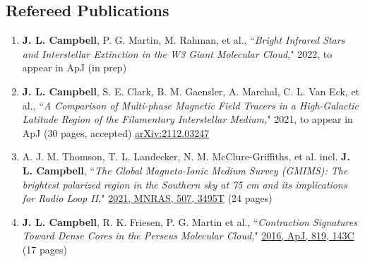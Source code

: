 \documentclass[10pt]{res} %
\begin{document}
\begin{resume}
\section{\Large Refereed Publications}
\vspace{-5pt} %
\noindent\makebox[\linewidth]{\rule{\textwidth}{0.4pt}}
\vspace{-15pt} %

\begin{enumerate}[{start=4,label=\arabic*.\addtocounter{enumi}{-2}}]
\itemsep-1em 
	\item \textbf{J. L. Campbell}, P. G. Martin, M. Rahman, et al., ``\textit{Bright Infrared Stars and Interstellar Extinction in the W3 Giant Molecular Cloud,}" 2022, to appear in ApJ (in prep) \\
	\item \textbf{J. L. Campbell}, S. E. Clark, B. M. Gaensler, A. Marchal, C. L. Van Eck, et al., ``\textit{A Comparison of Multi-phase Magnetic Field Tracers in a High-Galactic Latitude Region of the Filamentary Interstellar Medium,}" 2021, to appear in ApJ (30 pages, accepted) \href{https://ui.adsabs.harvard.edu/abs/2021arXiv211203247C/abstract}{arXiv:2112.03247}  \\
	\item A. J. M. Thomson, T. L. Landecker, N. M. McClure-Griffiths, et al. incl. \textbf{J. L. Campbell}, ``\textit{The Global Magneto-Ionic Medium Survey (GMIMS): The brightest polarized region in the Southern sky at 75 cm and its implications for Radio Loop II,}" \href{https://ui.adsabs.harvard.edu/abs/2021arXiv210612595T/abstract}{2021, MNRAS, 507, 3495T} (24 pages) \\
	\item \textbf{J. L. Campbell}, R. K. Friesen, P. G. Martin et al., ``\textit{Contraction Signatures Toward Dense Cores in the Perseus Molecular Cloud,}" \href{https://ui.adsabs.harvard.edu/abs/2016ApJ...819..143C/abstract}{2016, ApJ, 819, 143C} (17 pages)
\end{enumerate}



\end{resume}
\end{document}
